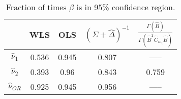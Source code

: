 \begin{table}[ht]
\centering
\begin{tabular}{ccccc}
  \hline
 & WLS & OLS & $(\Sigma + \widehat{\Delta})^{-1}$ & $\frac{\Gamma(\widehat{B})}{\Gamma(\widehat{B}^T\widehat{C}_{m_i}\widehat{B})}$ \\ 
  \hline
$\widehat{\nu}_1$ & 0.536 & 0.945 & 0.807 & ----- \\ 
  $\widehat{\nu}_2$ & 0.393 & 0.96 & 0.843 & 0.759 \\ 
  $\widehat{\nu}_{OR}$ & 0.925 & 0.945 & 0.956 & ----- \\ 
   \hline
\end{tabular}
\caption{Fraction of times $\beta$ is in 95\% confidence region.} 
\label{tab:CI}
\end{table}
